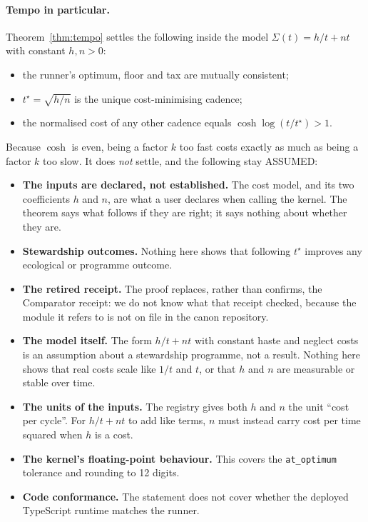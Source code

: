 \documentclass[11pt]{article}
\theoremstyle{definition}
\theoremstyle{remark}
\begin{document}
\paragraph{Tempo in particular.} Theorem~\ref{thm:tempo} settles the following inside the model
$\Sigma(t)=h/t+nt$ with constant $h,n>0$:
\begin{itemize}
\item the runner's optimum, floor and tax are mutually consistent;
\item $t^\star=\sqrt{h/n}$ is the unique cost-minimising cadence;
\item the normalised cost of any other cadence equals $\cosh\log(t/t^\star)>1$.
\end{itemize}
Because $\cosh$ is even, being a factor $k$ too fast costs exactly as much as being a factor $k$ too slow.
It does \emph{not} settle, and the following stay ASSUMED:
\begin{itemize}
\item \textbf{The inputs are declared, not established.} The cost model, and its two coefficients $h$ and $n$, are what a user
declares when calling the kernel. The theorem says what follows if they are right; it says nothing about whether they are.
\item \textbf{Stewardship outcomes.} Nothing here shows that following $t^\star$ improves any ecological or programme outcome.
\item \textbf{The retired receipt.} The proof replaces, rather than confirms, the Comparator receipt: we do not know what that
receipt checked, because the module it refers to is not on file in the canon repository.
\item \textbf{The model itself.} The form $h/t+nt$ with constant haste and neglect costs is an assumption about a
stewardship programme, not a result. Nothing here shows that real costs scale like $1/t$ and $t$, or that $h$ and $n$ are
measurable or stable over time.
\item \textbf{The units of the inputs.} The registry gives both $h$ and $n$ the unit ``cost per cycle''. For $h/t+nt$ to add like
terms, $n$ must instead carry cost per time squared when $h$ is a cost.
\item \textbf{The kernel's floating-point behaviour.} This covers the \texttt{at\_optimum} tolerance and rounding to 12 digits.
\item \textbf{Code conformance.} The statement does not cover whether the deployed TypeScript runtime matches the runner.
\end{itemize}
\end{document}

